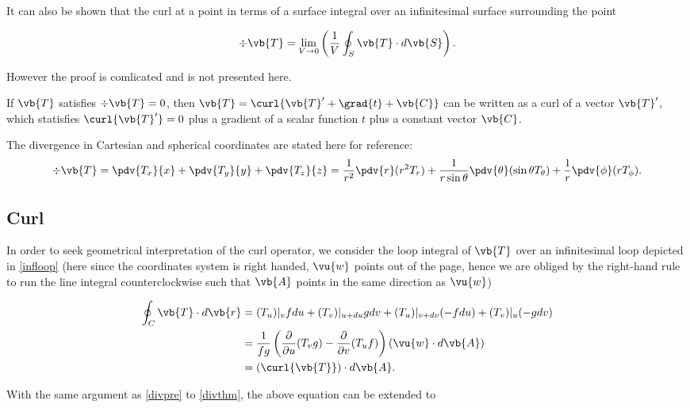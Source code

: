 \documentclass[english,a4paper,12pt]{report}
\begin{document}
It can also be shown that the curl at a point in terms of a surface integral over an infinitesimal surface surrounding the point

\begin{equation}
	\div{\vb{T} } = \lim_{V \to 0} \left( \frac{1}{V} \oint_{S} \vb{T}  \cdot d\vb{S}  \right).
\end{equation}

However the proof is comlicated and is not presented here.

If \(\vb{T} \) satisfies \(\div{\vb{T} } = 0 \), then \(\vb{T} = \curl{\vb{T} ' + \grad{t} + \vb{C} } \) can be written as a curl of a vector \(\vb{T} '\), which statisfies \(\curl{\vb{T} '} = 0 \) plus a gradient of a scalar function \(t\) plus a constant vector \(\vb{C} \).        

The divergence in Cartesian and spherical coordinates are stated here for reference:
\begin{equation} 
	\div{\vb{T}} = \pdv{T_x}{x} + \pdv{T_y}{y} + \pdv{T_z}{z} = \frac{1}{r^2}\pdv{r}(r^2T_r) + \frac{1}{r\sin{\theta}}\pdv{\theta}(\sin{\theta}T_{\theta}) + \frac{1}{r}\pdv{\phi}(rT_{\phi}). 
\end{equation}
	
\subsection{Curl}


In order to seek geometrical interpretation of the curl operator, we consider the loop integral of \(\vb{T}\) over an infinitesimal loop depicted in \cref{infloop} (here since the coordinates system is right handed, \(\vu{w}\) points out of the page, hence we are obliged by the right-hand rule to run the line integral counterclockwise such that \(\vb{A}\) points in the same direction as \(\vu{w}\))
	
\begin{equation} 
	\begin{aligned} 
		\oint_{C} \vb{T} \cdot d\vb{r} &= (T_u)|_{v}fdu + (T_v)|_{u+du}gdv + (T_u)|_{v+dv}(-fdu) + (T_v)|_{u}(-gdv) \\ &= \frac{1}{fg}\left(\frac{\partial }{\partial u} (T_{v} g) - \frac{\partial }{\partial v} (T_{u}f)\right)(\vu{w} \cdot d\vb{A}) \\ &= (\curl{\vb{T} } ) \cdot d\vb{A} . 
	\end{aligned} 
\end{equation}

With the same argument as \cref{divpre}  to \cref{divthm}, the above equation can be extended to
	
\end{document}
